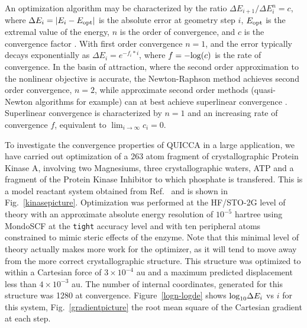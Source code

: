 \documentclass[prl,aps,preprint,showpacs,superbib]{revtex4}
\begin{document}
An optimization algorithm may be characterized by the ratio ${\Delta E_{i+1}}/{\Delta E_{i}^n} =c$,
where $\Delta E_i = |E_{i}-E_{\rm opt}| $ is the absolute error at geometry step $i$,
$E_{\rm opt}$ is the extremal value of the energy, $n$ is the order of convergence, 
and $c$ is the convergence factor \cite{Quarteroni}.  With first order convergence $n=1$, and
the error typically decays exponentially as $\Delta E_i = e^{-f_i*i}$, where $f=-{\rm log}(c)$ is the 
rate of convergence. In the basin of attraction, where the second order approximation 
to the nonlinear objective is accurate, the Newton-Raphson method achieves second order convergence,
$ n=2$, while approximate second order methods (quasi-Newton algorithms for example) can 
at best achieve superlinear convergence \cite{RFletcher,Pulay_natural_internals}.   Superlinear 
convergence is characterized by $n=1$ and an increasing rate of convergence $f$, equivalent to 
$\lim_{i \to \infty} c_i = 0$.  

To investigate the convergence properties of QUICCA in a large application, we have carried out
optimization of a 263 atom fragment of crystallographic Protein Kinase A, involving two Magnesiums,
three crystallographic waters, ATP and a fragment of the Protein Kinase Inhibitor to which phosphate 
is transfered. This is a model reactant system obtained from Ref.~ and is shown in 
Fig.~\ref{kinasepicture}.  Optimization was performed at the HF/STO-2G level of theory with an 
approximate absolute energy resolution of $10^{-5}$ hartree using MondoSCF \cite{MondoSCF} at the 
{\tt tight} accuracy level and with ten peripheral atoms  constrained to mimic steric effects of the enzyme.  
Note that this minimal level of theory actually makes more work for the optimizer, as it will tend to 
move away from the more correct crystallographic structure.   This structure was optimized to within a 
Cartesian force of $3\times10^{-4}$ au and a maximum predicted displacement less than $4\times10^{-3}$ au.
The number of internal coordinates, generated for this structure was 1280 at convergence.  Figure~\ref{logn-logde} 
shows ${\rm log}_{10} \Delta E_i$ vs $i$ for this system, Fig.~\ref{gradientpicture} the root mean square 
of the Cartesian gradient at each step.
\end{document}
